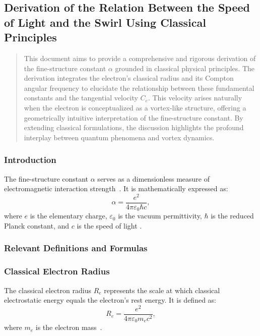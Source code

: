 
\subsection{Derivation of the Relation Between the Speed of Light and the Swirl Using Classical Principles}

\begin{abstract}
    This document aims to provide a comprehensive and rigorous derivation of the fine-structure constant $\alpha$ grounded in classical physical principles. The derivation integrates the electron's classical radius and its Compton angular frequency to elucidate the relationship between these fundamental constants and the tangential velocity $C_e$. This velocity arises naturally when the electron is conceptualized as a vortex-like structure, offering a geometrically intuitive interpretation of the fine-structure constant. By extending classical formulations, the discussion highlights the profound interplay between quantum phenomena and vortex dynamics.
\end{abstract}

\subsubsection{Introduction}
The fine-structure constant $\alpha$ serves as a dimensionless measure of electromagnetic interaction strength~\cite{maxwell1861}. It is mathematically expressed as:
\begin{equation}
    \alpha = \frac{e^2}{4\pi \varepsilon_0 \hbar c},
\end{equation}
where $e$ is the elementary charge, $\varepsilon_0$ is the vacuum permittivity, $\hbar$ is the reduced Planck constant, and $c$ is the speed of light \cite{dirac1930quantum}.

\subsubsection{Relevant Definitions and Formulas}
\subsubsection{Classical Electron Radius}
The classical electron radius $R_e$ represents the scale at which classical electrostatic energy equals the electron’s rest energy. It is defined as:
\begin{equation}
    R_e = \frac{e^2}{4\pi \varepsilon_0 m_e c^2},
\end{equation}
where $m_e$ is the electron mass~\cite{helmholtz1858}.

